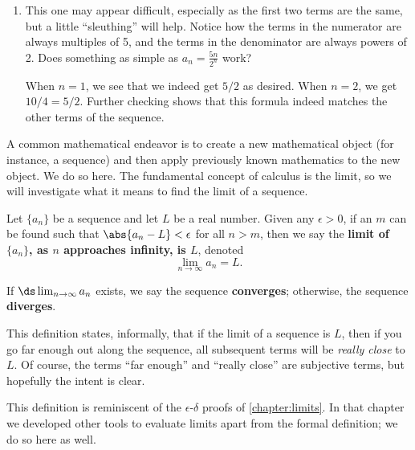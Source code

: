 \begin{example}
\begin{enumerate}
\item		This one may appear difficult, especially as the first two terms are the same, but a little ``sleuthing'' will help. Notice how the terms in the numerator are always multiples of 5, and the terms in the denominator are always powers of 2. Does something as simple as $a_n = \frac{5n}{2^n}$ work?

When $n=1$, we see that we indeed get $5/2$ as desired. When $n=2$, we get $10/4 = 5/2$. Further checking shows that this formula indeed matches the other terms of the sequence.
\end{enumerate}
\end{example}

A common mathematical endeavor is to create a new mathematical object (for instance, a sequence) and then apply previously known mathematics to the new object. We do so here. The fundamental concept of calculus is the limit, so we will investigate what it means to find the limit of a sequence.

\begin{definition}\label{def:seq_limit}%
Let $\{a_n\}$ be a sequence and let $L$ be a real number. Given any $\epsilon>0$, if an $m$ can be found such that $\abs{a_n-L}<\epsilon$ for all $n>m$, then we say the \textbf{limit of $\{a_n\}$, as $n$ approaches infinity, is $L$}, denoted \[\lim_{n\to\infty}a_n = L.\]

If $\ds\lim_{n\to\infty} a_n$ exists, we say the sequence \textbf{converges}; otherwise, the sequence \textbf{diverges}.
\end{definition}

This definition states, informally, that if the limit of a sequence is $L$, then if you go far enough out along the sequence, all subsequent terms will be \emph{really close} to $L$. Of course, the terms ``far enough'' and ``really close'' are subjective terms, but hopefully the intent is clear.

This definition is reminiscent of the $\epsilon$-$\delta$ proofs of \autoref{chapter:limits}. In that chapter we developed other tools to evaluate limits apart from the formal definition; we do so here as well.

